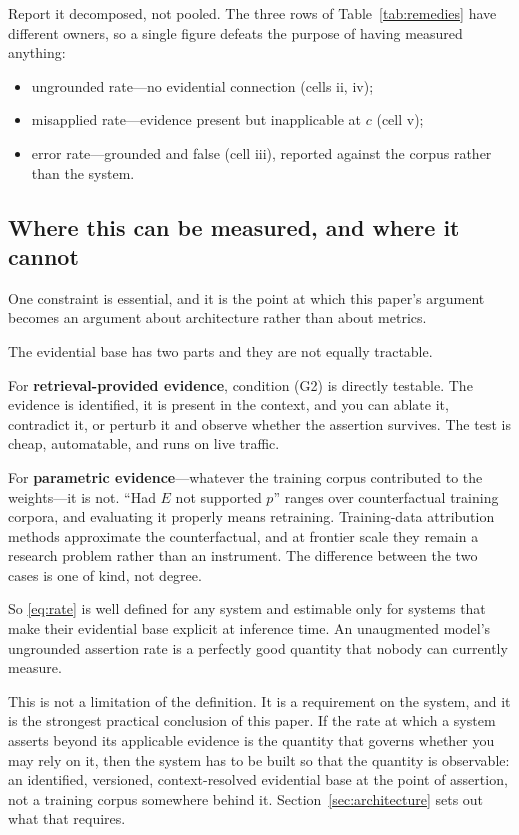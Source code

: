 \documentclass[11pt]{article}
\theoremstyle{plain}
\theoremstyle{definition}
\begin{document}
Report it decomposed, not pooled. The three rows of
Table~\ref{tab:remedies} have different owners, so a single figure defeats the
purpose of having measured anything:
\begin{itemize}
  \item ungrounded rate---no evidential connection (cells ii, iv);
  \item misapplied rate---evidence present but inapplicable at $c$ (cell v);
  \item error rate---grounded and false (cell iii), reported against the corpus
        rather than the system.
\end{itemize}

\subsection{Where this can be measured, and where it cannot}
\label{sec:measurability}

One constraint is essential, and it is the point at which this paper's argument
becomes an argument about architecture rather than about metrics.

The evidential base has two parts and they are not equally tractable.

For \textbf{retrieval-provided evidence}, condition (G2) is directly testable.
The evidence is identified, it is present in the context, and you can ablate it,
contradict it, or perturb it and observe whether the assertion survives. The test
is cheap, automatable, and runs on live traffic.

For \textbf{parametric evidence}---whatever the training corpus contributed to the
weights---it is not. ``Had $E$ not supported $p$'' ranges over counterfactual
training corpora, and evaluating it properly means retraining. Training-data
attribution methods approximate the counterfactual, and at frontier scale they
remain a research problem rather than an instrument. The difference between the two
cases is one of kind, not degree.

So \eqref{eq:rate} is well defined for any system and estimable only for systems
that make their evidential base explicit at inference time. An unaugmented model's
ungrounded assertion rate is a perfectly good quantity that nobody can currently
measure.

This is not a limitation of the definition. It is a requirement on the system, and
it is the strongest practical conclusion of this paper. If the rate at which a
system asserts beyond its applicable evidence is the quantity that governs whether
you may rely on it, then the system has to be built so that the quantity is
observable: an identified, versioned, context-resolved evidential base at the
point of assertion, not a training corpus somewhere behind it.
Section~\ref{sec:architecture} sets out what that requires.
\end{document}
